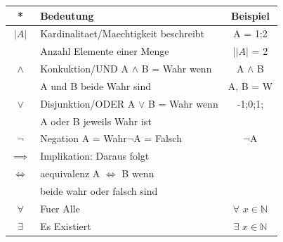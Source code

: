 \begin{multicols}{2}
    \begin{tabularx}{0.5\textwidth} {
            | >{\raggedright\arraybackslash}c
            | >{\raggedright\arraybackslash}X
            | >{\raggedright\arraybackslash}c |}
        \hline
        \textbf{*}            & \textbf{Bedeutung}                         & \textbf{Beispiel}             \\ \hline
        $|A|$                 & Kardinalitaet/Maechtigkeit beschreibt      & A = {1;2}                     \\
                              & Anzahl Elemente einer Menge                & |$|A|$ = 2                    \\ \hline
        $\land$               & Konkuktion/UND A $\land$ B = Wahr wenn     & A $\land$ B                   \\
                              & A und B beide Wahr sind                    & A, B = W                      \\ \hline
        $\lor$                & Disjunktion/ODER A $\lor$ B  = Wahr wenn   & {-1;0;1;}                     \\
                              & A oder B  jeweils Wahr ist                 &                               \\ \hline
        $\neg$                & Negation A = Wahr$\neg$A = Falsch          & $\neg $A                      \\\hline
        $\implies$            & Implikation: Daraus folgt                  &                               \\ \hline
        $\Longleftrightarrow$ & aequivalenz A $\Longleftrightarrow$ B wenn &                               \\
                              & beide wahr oder falsch sind                &                               \\ \hline
        $\forall$             & Fuer Alle                                  & $\forall$ $x \in \mathbb{N}$  \\ \hline
        $\exists$             & Es Existiert                               & $\exists $ $x \in \mathbb{N}$ \\ \hline
    \end{tabularx}


\end{multicols}
